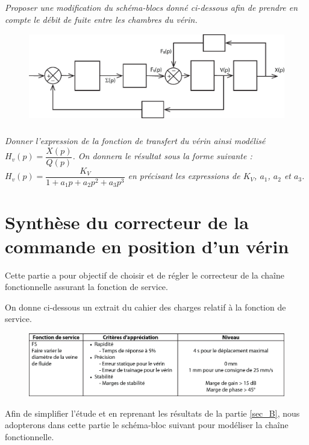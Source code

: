 \documentclass[10pt,fleqn]{article} %
\begin{document}
\subparagraph{}\textit{Proposer une modification du schéma-blocs donné ci-dessous afin de prendre en compte le débit de fuite entre les chambres du vérin.  }

\begin{figure}[H]
\centering
\includegraphics[width=.7\linewidth]{dr_Q31}
\end{figure}



\subparagraph{}\textit{Donner l'expression de la fonction de transfert du vérin ainsi modélisé  $H_v(p)=\dfrac{X(p)}{Q(p)}$. On donnera le résultat sous la forme suivante : $H_v(p)= \dfrac{K_V}{1+a_1p + a_2p^2 + a_3 p^3}$ en précisant les expressions de $K_V$, $a_1$, $a_2$ et $a_3$.}

\section{Synthèse du correcteur de la commande en position d'un vérin}
\begin{obj}
Cette partie a pour objectif de choisir et de régler le correcteur de la chaîne fonctionnelle assurant la fonction de service.
\end{obj}

	On donne ci-dessous un extrait du cahier des charges relatif à la fonction de service.
	

\begin{figure}[H]
\centering
\includegraphics[width=\linewidth]{img_09}
\end{figure}

	Afin de simplifier l'étude et en reprenant les résultats de la partie \ref{sec_B}, nous adopterons dans cette partie le schéma-bloc suivant pour modéliser la chaîne fonctionnelle.
	
\end{document}
